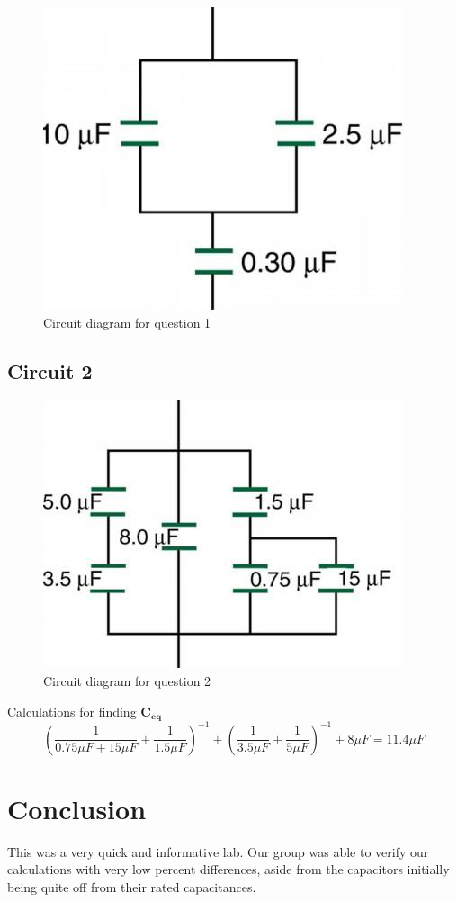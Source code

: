 \documentclass[titlepage]{article}
\begin{document}
        \begin{figure}[hbt!]
            \centering
            \caption{Circuit diagram for question 1}
            \includegraphics{questions/1}
        \end{figure}



    
    	\subsection{Circuit 2}
        \begin{figure}[hbt!]
            \centering
            \caption{Circuit diagram for question 2}
            \includegraphics{questions/2}
        \end{figure}

    {{Calculations for finding $\mathbf{C_{eq}}$}}
        $$\left( \frac{1}{0.75\mu F+15\mu F}+\frac{1}{1.5\mu F} \right)^{-1}+\left(\frac{1}{3.5\mu F}+\frac{1}{5\mu F}\right)^{-1}+8\mu F  = 11.4 \mu F$$


    
    
  	\section{Conclusion}
    This was a very quick and informative lab. Our group was able to verify our calculations with very low percent differences, aside from the capacitors initially being quite off from their rated capacitances. 
\end{document}
